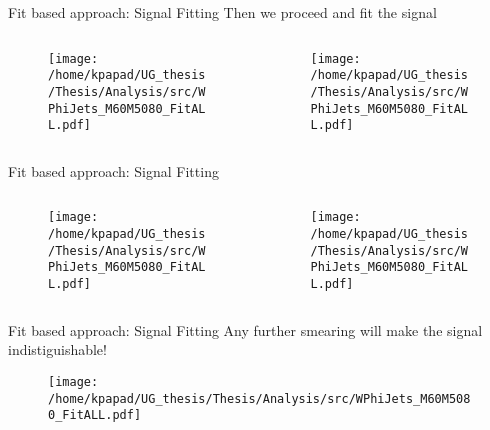 \documentclass[bigger]{beamer}
\begin{document}
\begin{frame}[label={sec:org6104694}]{Fit based approach: Signal Fitting}
Then we proceed and fit the signal
\begin{columns}
\begin{column}{0.5\columnwidth}
\begin{figure}[h]
\centering
\texttt{[image: /home/kpapad/UG\_thesis/Thesis/Analysis/src/WPhiJets\_M60M5080\_FitALL.pdf]}
\end{figure}
\end{column}

\begin{column}{0.5\columnwidth}
\begin{figure}[h]
\centering
\texttt{[image: /home/kpapad/UG\_thesis/Thesis/Analysis/src/WPhiJets\_M60M5080\_FitALL.pdf]}
\end{figure}
\end{column}
\end{columns}
\end{frame}

\begin{frame}[label={sec:orgdfa3878}]{Fit based approach: Signal Fitting}
\begin{columns}
\begin{column}{0.5\columnwidth}
\begin{figure}[h]
\centering
\texttt{[image: /home/kpapad/UG\_thesis/Thesis/Analysis/src/WPhiJets\_M60M5080\_FitALL.pdf]}
\end{figure}
\end{column}

\begin{column}{0.5\columnwidth}
\begin{figure}[h]
\centering
\texttt{[image: /home/kpapad/UG\_thesis/Thesis/Analysis/src/WPhiJets\_M60M5080\_FitALL.pdf]}
\end{figure}
\end{column}
\end{columns}
\end{frame}

\begin{frame}[label={sec:org9e447df}]{Fit based approach: Signal Fitting}
Any further smearing will make the signal indistiguishable!
\begin{figure}[h]
\centering
\texttt{[image: /home/kpapad/UG\_thesis/Thesis/Analysis/src/WPhiJets\_M60M5080\_FitALL.pdf]}
\end{figure}
\end{frame}
\end{document}
